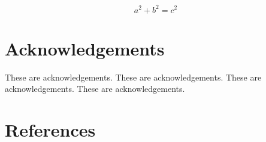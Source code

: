 \documentclass[11pt]{article}
\begin{document}
\begin{equation}
a^2 + b^2 = c^2
\tag*{Equation 1}
\end{equation}


\section{Acknowledgements}

These are acknowledgements. These are acknowledgements. These are acknowledgements. These are acknowledgements.

\section{References}



\end{document}
